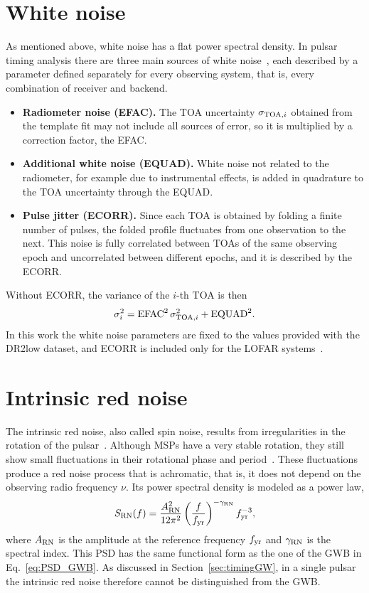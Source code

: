 \section{White noise} \label{sec:wn}

As mentioned above, white noise has a flat power spectral density. In pulsar
timing analysis there are three main sources of white noise~\cite{Taylor2021}, each described by
a parameter defined separately for every observing system, that is, every
combination of receiver and backend.
\begin{itemize}
    \item \textbf{Radiometer noise (EFAC).} The TOA uncertainty
    $\sigma_{{\rm TOA},i}$ obtained from the template fit may not include all
    sources of error, so it is multiplied by a correction factor, the EFAC.
    \item \textbf{Additional white noise (EQUAD).} White noise not related to
    the radiometer, for example due to instrumental effects, is added in
    quadrature to the TOA uncertainty through the EQUAD.
    \item \textbf{Pulse jitter (ECORR).} Since each TOA is obtained by folding a
    finite number of pulses, the folded profile fluctuates from one observation
    to the next. This noise is fully correlated between TOAs of the same
    observing epoch and uncorrelated between different epochs, and it is
    described by the ECORR.
\end{itemize}
Without ECORR, the variance of the $i$-th TOA is then
\begin{equation}
    \sigma_i^2 = \mathrm{EFAC}^2\,\sigma_{{\rm TOA},i}^2 + \mathrm{EQUAD}^2 .
    \label{eq:sigma_wn}
\end{equation}
In this work the white noise parameters are fixed to the values provided with
the DR2low dataset, and ECORR is included only for the LOFAR
systems~\cite{Iraci2025}.

\section{Intrinsic red noise} \label{sec:rn}

The intrinsic red noise, also called spin noise, results from irregularities in
the rotation of the pulsar~\cite{Shaifullah2025}. Although MSPs have a very stable rotation, they
still show small fluctuations in their rotational phase and period~\cite{Taylor2021}. These
fluctuations produce a red noise process that is achromatic, that is, it does
not depend on the observing radio frequency $\nu$. Its power spectral density is
modeled as a power law,
\begin{equation}
    S_{\rm RN}(f) = \frac{A_{\rm RN}^2}{12\pi^2}
    \left(\frac{f}{f_{\mathrm{yr}}}\right)^{-\gamma_{\rm RN}}f_{\mathrm{yr}}^{-3},
    \label{eq:PSD_RN}
\end{equation}
where $A_{\rm RN}$ is the amplitude at the reference frequency $f_{\mathrm{yr}}$ and
$\gamma_{\rm RN}$ is the spectral index. This PSD has the same functional form
as the one of the GWB in Eq.~\eqref{eq:PSD_GWB}. As discussed in
Section~\ref{sec:timingGW}, in a single pulsar the intrinsic red noise therefore
cannot be distinguished from the GWB.

